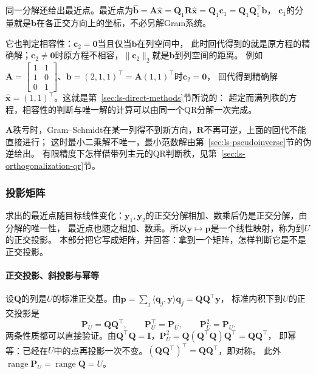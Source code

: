 同一分解还给出最近点。最近点为$\hat{\bm b}=\bm A\hat{\bm x}=\bm Q_1\bm R\hat{\bm x}=\bm Q_1\bm c_1=\bm Q_1\bm Q_1^\top\bm b$，
$\bm c_1$的分量就是$\bm b$在各正交方向上的坐标，不必另解Gram系统。

它也判定相容性：$\bm c_2=\bm0$当且仅当$\bm b$在列空间中，
此时回代得到的就是原方程的精确解；$\bm c_2\neq\bm0$时原方程不相容，$\lVert\bm c_2\rVert_2$就是$\bm b$到列空间的距离。
例如$\bm A=\left[\begin{smallmatrix}1&1\\1&0\\0&1\end{smallmatrix}\right]$、$\bm b=(2,1,1)^\top=\bm A(1,1)^\top$时$\bm c_2=\bm0$，
回代得到精确解$\hat{\bm x}=(1,1)^\top$。这就是第~\ref{sec:ls-direct-methods}节所说的：
超定而满列秩的方程，相容性的判断与唯一解的计算可以由同一个QR分解一次完成。

$\bm A$秩亏时，Gram--Schmidt在某一列得不到新方向，$\bm R$不再可逆，上面的回代不能直接进行；
这时最小二乘解不唯一，最小范数解由第~\ref{sec:ls-pseudoinverse}节的伪逆给出。
有限精度下怎样借带列主元的QR判断秩，见第~\ref{sec:ls-orthogonalization-qr}节。

\subsubsection{投影矩阵}
\label{sec:ls-projection-matrices}

求出的最近点随目标线性变化：$\bm y_1,\bm y_2$的正交分解相加、数乘后仍是正交分解，由分解的唯一性，
最近点也随之相加、数乘。所以$\bm y\mapsto\bm p$是一个线性映射，称为到$U$的正交投影。
本部分把它写成矩阵，并回答：拿到一个矩阵，怎样判断它是不是正交投影。

\paragraph{正交投影、斜投影与幂等}

设$\bm Q$的列是$U$的标准正交基。由$\bm p=\sum_j\langle\bm q_j,\bm y\rangle\bm q_j=\bm Q\bm Q^\top\bm y$，
标准内积下到$U$的正交投影是
\begin{equation}
 \bm P_U=\bm Q\bm Q^\top,\qquad
 \bm P_U^\top=\bm P_U,\qquad \bm P_U^2=\bm P_U.
 \label{eq:linear-algebra-orthogonal-projector}
\end{equation}
两条性质都可以直接验证。由$\bm Q^\top\bm Q=\bm I$，$\bm P_U^2=\bm Q(\bm Q^\top\bm Q)\bm Q^\top=\bm Q\bm Q^\top$，
即幂等：已经在$U$中的点再投影一次不变。$(\bm Q\bm Q^\top)^\top=\bm Q\bm Q^\top$，即对称。
此外$\operatorname{range}\bm P_U=\operatorname{range}\bm Q=U$。

